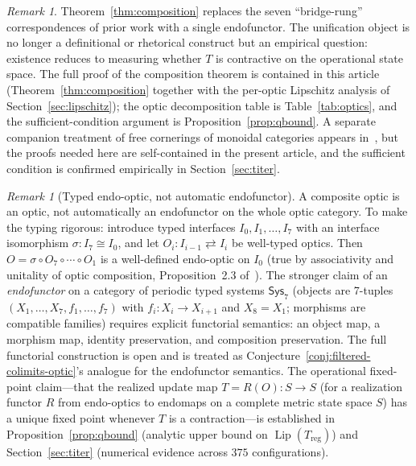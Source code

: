 \documentclass[11pt,a4paper]{article}
\theoremstyle{plain}
\theoremstyle{definition}
\theoremstyle{remark}
\newtheorem{remark}[theorem]{Remark}
\DeclareMathOperator{\Lip}{Lip}
\begin{document}
\begin{remark}
Theorem~\ref{thm:composition} replaces the seven ``bridge-rung''
correspondences of prior work with a single endofunctor. The
unification object is no longer a definitional or rhetorical construct
but an empirical question: existence reduces to measuring whether $T$
is contractive on the operational state space. The full proof of the composition theorem is
contained in this article (Theorem~\ref{thm:composition} together
with the per-optic Lipschitz analysis of
Section~\ref{sec:lipschitz}); the optic decomposition table is
Table~\ref{tab:optics}, and the sufficient-condition argument is
Proposition~\ref{prop:qbound}. A separate companion treatment of
free cornerings of monoidal categories appears
in~\cite{riley2023}, but the proofs needed here are self-contained
in the present article, and the sufficient condition is confirmed
empirically in Section~\ref{sec:titer}.
\end{remark}

\begin{remark}[Typed endo-optic, not automatic endofunctor]
\label{rem:typed-optic}
A composite optic is an optic, not automatically an endofunctor on the
whole optic category. To make the typing rigorous: introduce typed
interfaces $I_0, I_1, \ldots, I_7$ with an interface isomorphism
$\sigma : I_7 \cong I_0$, and let $O_i : I_{i-1} \rightleftarrows I_i$
be well-typed optics. Then $O = \sigma \circ O_7 \circ \cdots \circ O_1$
is a well-defined endo-optic on $I_0$ (true by associativity and
unitality of optic composition, Proposition~2.3 of~\cite{riley2018optics}).
The stronger claim of an \emph{endofunctor} on a category of periodic
typed systems $\mathsf{Sys}_7$ (objects are 7-tuples
$(X_1, \ldots, X_7, f_1, \ldots, f_7)$ with $f_i : X_i \to X_{i+1}$
and $X_8 = X_1$; morphisms are compatible families) requires explicit
functorial semantics: an object map, a morphism map, identity
preservation, and composition preservation. The full functorial
construction is open and is treated as
Conjecture~\ref{conj:filtered-colimits-optic}'s analogue for the
endofunctor semantics. The operational fixed-point claim---that the
realized update map $T = R(O) : S \to S$ (for a realization functor $R$
from endo-optics to endomaps on a complete metric state space $S$)
has a unique fixed point whenever $T$ is a contraction---is established
in Proposition~\ref{prop:qbound} (analytic upper bound on
$\Lip(T_{\mathrm{reg}})$) and Section~\ref{sec:titer} (numerical
evidence across $375$ configurations).
\end{remark}
\end{document}
